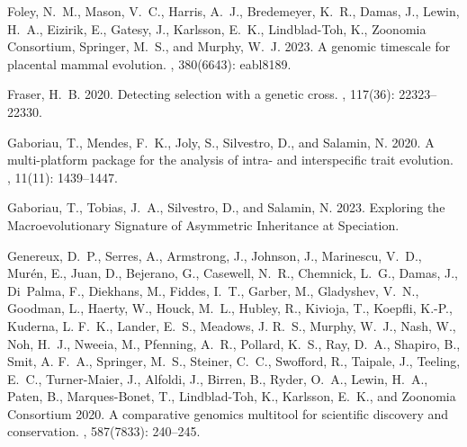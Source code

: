 \documentclass{article}
\begin{document}
\begin{thebibliography}{}
    Foley, N.~M., Mason, V.~C., Harris, A.~J., Bredemeyer, K.~R., Damas, J., Lewin,
    H.~A., Eizirik, E., Gatesy, J., Karlsson, E.~K., {Lindblad-Toh}, K.,
        {Zoonomia Consortium}, Springer, M.~S., and Murphy, W.~J. 2023.
    \newblock A genomic timescale for placental mammal evolution.
    , {380}(6643): eabl8189.

    Fraser, H.~B. 2020.
    \newblock Detecting selection with a genetic cross.
    , {117}(36):
    22323--22330.

    Gaboriau, T., Mendes, F.~K., Joly, S., Silvestro, D., and Salamin, N. 2020.
    \newblock A multi-platform package for the analysis of intra- and interspecific
    trait evolution.
    , {11}(11): 1439--1447.

    Gaboriau, T., Tobias, J.~A., Silvestro, D., and Salamin, N. 2023.
    \newblock Exploring the {{Macroevolutionary Signature}} of {{Asymmetric
    Inheritance}} at {{Speciation}}.

    Genereux, D.~P., Serres, A., Armstrong, J., Johnson, J., Marinescu, V.~D.,
    Mur{\'e}n, E., Juan, D., Bejerano, G., Casewell, N.~R., Chemnick, L.~G.,
    Damas, J., Di~Palma, F., Diekhans, M., Fiddes, I.~T., Garber, M., Gladyshev,
    V.~N., Goodman, L., Haerty, W., Houck, M.~L., Hubley, R., Kivioja, T.,
    Koepfli, K.-P., Kuderna, L. F.~K., Lander, E.~S., Meadows, J. R.~S., Murphy,
    W.~J., Nash, W., Noh, H.~J., Nweeia, M., Pfenning, A.~R., Pollard, K.~S.,
    Ray, D.~A., Shapiro, B., Smit, A. F.~A., Springer, M.~S., Steiner, C.~C.,
    Swofford, R., Taipale, J., Teeling, E.~C., {Turner-Maier}, J., Alfoldi, J.,
    Birren, B., Ryder, O.~A., Lewin, H.~A., Paten, B., {Marques-Bonet}, T.,
        {Lindblad-Toh}, K., Karlsson, E.~K., and {Zoonomia Consortium} 2020.
    \newblock A comparative genomics multitool for scientific discovery and
    conservation.
    , {587}(7833): 240--245.


\end{thebibliography}
\end{document}
